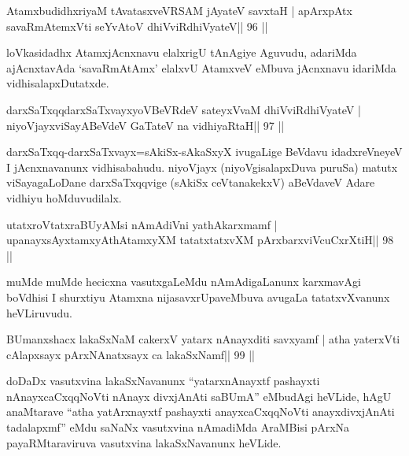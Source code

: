 
\begin{shl}
AtamxbudidhxriyaM tAvatasxveVRSAM jAyateV savxtaH |
apArxpAtx savaRmAtemxVti seYvAtoV dhiVviRdhiVyateV\hfill || 96 ||
\end{shl}

\begin{artha}
loVkasidadhx AtamxjAcnxnavu elalxrigU tAnAgiye Aguvudu, adariMda ajAcnxtavAda `savaRmAtAmx' elalxvU AtamxveV eMbuva jAcnxnavu idariMda vidhisalapxDutatxde.
\end{artha}


\begin{shl}
darxSaTxqqdarxSaTxvayxyoVBeVRdeV sateyxVvaM dhiVviRdhiVyateV |
niyoVjayxviSayABeVdeV GaTateV na vidhiyaRtaH\hfill || 97 ||
\end{shl}

\begin{artha}
darxSaTxqq-darxSaTxvayx=sAkiSx-sAkaSxyX ivugaLige BeVdavu
idadxreVneyeV I jAcnxnavanunx vidhisabahudu. niyoVjayx
(niyoVgisalapxDuva puruSa) matutx viSayagaLoDane darxSaTxqqvige
(sAkiSx ceVtanakekxV) aBeVdaveV Adare vidhiyu hoMduvudilalx. 
\end{artha}


\begin{shl}
\footnotemark[1]utatxroVtatxraBUyAMsi nAmAdiVni yathAkarxmamf |
upanayxsAyx\s\s tamxyAthAtamxyXM tatatxtatxvXM pArxbarxviVcuCxrXtiH\hfill || 98 ||
\end{shl}

\begin{artha}
muMde muMde hecicxna vasutxgaLeMdu nAmAdigaLanunx karxmavAgi boVdhisi I shurxtiyu Atamxna nijasavxrUpaveMbuva avugaLa tatatxvXvanunx heVLiruvudu.
\end{artha}

\begin{shl}
BUmanxshacx lakaSxNaM cakerxV yatarx nAnayxditi savxyamf |
atha yaterxVti cAlapxsayx pArxNAnatxsayx ca lakaSxNamf\hfill || 99 ||
\end{shl}

\begin{artha}
doDaDx vasutxvina lakaSxNavanunx ``\footnotemark[1]yatarxnAnayxtf 
pashayxti nAnayxcaCxqqNoVti nAnayx divxjAnAti saBUmA'' eMbudAgi
heVLide, hAgU anaMtarave ``\footnotemark[1]atha yatArxnayxtf pashayxti
anayxcaCxqqNoVti anayxdivxjAnAti tadalapxmf'' eMdu saNaNx vasutxvina
nAmadiMda AraMBisi pArxNa payaRMtaraviruva vasutxvina lakaSxNavanunx
heVLide. 
\end{artha}

